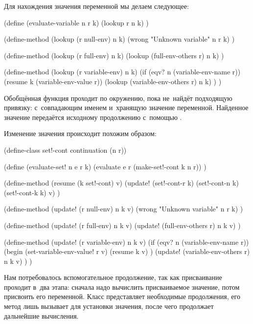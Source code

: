 Для нахождения значения переменной мы делаем следующее:

\begin{code:lisp}
(define (evaluate-variable n r k)
  (lookup r n k) )

(define-method (lookup (r null-env) n k)
  (wrong "Unknown variable" n r k) )

(define-method (lookup (r full-env) n k)
  (lookup (full-env-others r) n k) )

(define-method (lookup (r variable-env) n k)
  (if (eqv? n (variable-env-name r))
      (resume k (variable-env-value r))
      (lookup (variable-env-others r) n k) ) )
\end{code:lisp}

Обобщённая функция  проходит по окружению, пока не~найдёт подходящую
привязку: с~совпадающим именем и~хранящую значение переменной. Найденное
значение передаётся исходному продолжению с~помощью .

Изменение значения происходит похожим образом:

\begin{code:lisp}
(define-class set!-cont continuation (n r))

(define (evaluate-set! n e r k)
  (evaluate e r (make-set!-cont k n r)) )

(define-method (resume (k set!-cont) v)
  (update! (set!-cont-r k) (set!-cont-n k) (set!-cont-k k) v) )

(define-method (update! (r null-env) n k v)
  (wrong "Unknown variable" n r k) )

(define-method (update! (r full-env) n k v)
  (update! (full-env-others r) n k v) )

(define-method (update! (r variable-env) n k v)
  (if (eqv? n (variable-env-name r))
      (begin (set-variable-env-value! r v)
             (resume k v) )
      (update! (variable-env-others r) n k v) ) )
\end{code:lisp}

Нам потребовалось вспомогательное продолжение, так как присваивание проходит
в~два этапа: сначала надо вычислить присваиваемое значение, потом присвоить его
переменной. Класс  представляет необходимые продолжения, его метод
 лишь вызывает  для установки значения, после чего
продолжает дальнейшие вычисления.


